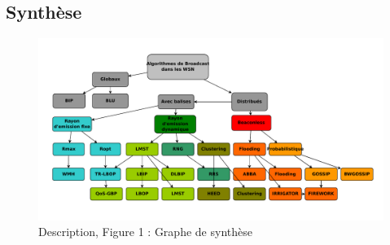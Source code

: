 \subsection{Synthèse}



\newpage

\begin{figure}[H]
\centering
\includegraphics[scale=1,angle=90]{Etat_de_l'art/source/classification}
\caption{Description, Figure 1 : Graphe de synthèse}
\end{figure} 


